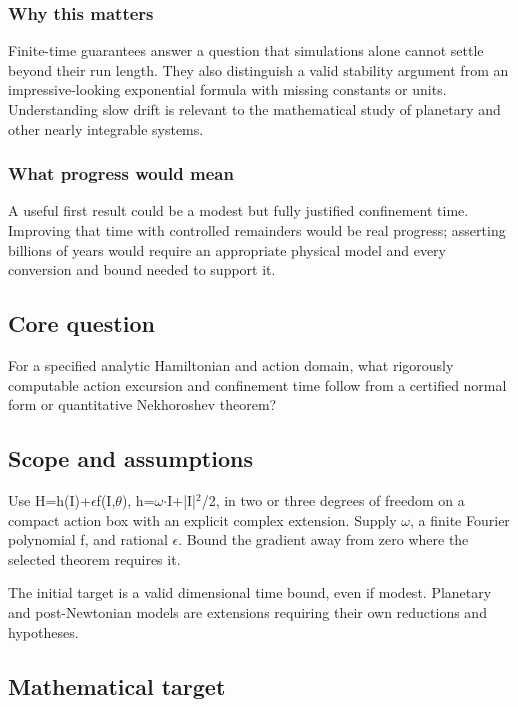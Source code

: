 \documentclass[
  11pt,
]{article}
\begin{document}
\subsubsection{Why this matters}

Finite-time guarantees answer a question that simulations alone cannot
settle beyond their run length. They also distinguish a valid stability
argument from an impressive-looking exponential formula with missing
constants or units. Understanding slow drift is relevant to the
mathematical study of planetary and other nearly integrable systems.

\subsubsection{What progress would mean}

A useful first result could be a modest but fully justified confinement
time. Improving that time with controlled remainders would be real
progress; asserting billions of years would require an appropriate
physical model and every conversion and bound needed to support it.

\subsection{Core question}

For a specified analytic Hamiltonian and action domain, what rigorously
computable action excursion and confinement time follow from a certified
normal form or quantitative Nekhoroshev theorem?

\subsection{Scope and assumptions}

Use H=h(I)+\ensuremath{\epsilon}f(I,\ensuremath{\theta}),
h=\ensuremath{\omega}\ensuremath{\cdot}I+|I|\ensuremath{{}^{2}}/2, in
two or three degrees of freedom on a compact action box with an explicit
complex extension. Supply \ensuremath{\omega}, a finite Fourier
polynomial f, and rational \ensuremath{\epsilon}. Bound the gradient
away from zero where the selected theorem requires it.

The initial target is a valid dimensional time bound, even if modest.
Planetary and post-Newtonian models are extensions requiring their own
reductions and hypotheses.

\subsection{Mathematical target}
\end{document}
